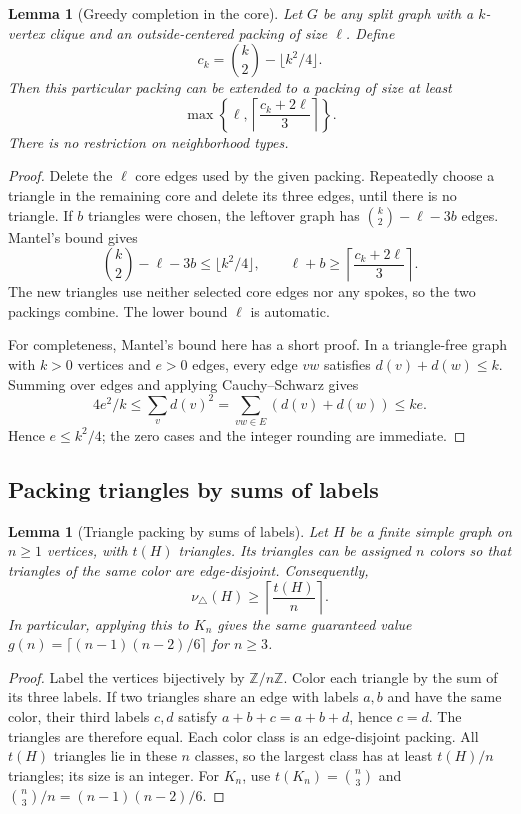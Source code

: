 \documentclass[11pt]{article}
\newtheorem{lemma}[theorem]{Lemma}
\newcommand{\tp}{\nu_{\triangle}}
\begin{document}
\begin{lemma}[Greedy completion in the core]\label{lem:completion}
Let $G$ be any split graph with a $k$-vertex clique and an outside-centered
packing of size $\ell$. Define
\[
 c_k=\binom k2-\lfloor k^2/4\rfloor.
\]
Then this particular packing can be extended to a packing of size at least
\[
 \boxed{\max\left\{\ell,
      \left\lceil\frac{c_k+2\ell}{3}\right\rceil\right\}.}
\]
There is no restriction on neighborhood types.
\end{lemma}
\begin{proof}
Delete the $\ell$ core edges used by the given packing. Repeatedly choose
a triangle in the remaining core and delete its three edges, until there
is no triangle. If $b$ triangles were chosen, the leftover graph has
$\binom k2-\ell-3b$ edges. Mantel's bound gives
\[
 \binom k2-\ell-3b\leq\lfloor k^2/4\rfloor,
 \qquad
 \ell+b\geq\left\lceil\frac{c_k+2\ell}{3}\right\rceil.
\]
The new triangles use neither selected core edges nor any spokes, so the
two packings combine. The lower bound $\ell$ is automatic.

For completeness, Mantel's bound here has a short proof. In a
triangle-free graph with $k>0$ vertices and $e>0$ edges, every edge $vw$
satisfies $d(v)+d(w)\leq k$. Summing over edges and applying
Cauchy--Schwarz gives
\[
 4e^2/k\leq\sum_v d(v)^2
   =\sum_{vw\in E}(d(v)+d(w))\leq ke.
\]
Hence $e\leq k^2/4$; the zero cases and the integer rounding are immediate.
\end{proof}


\subsection{Packing triangles by sums of labels}

\begin{lemma}[Triangle packing by sums of labels]\label{lem:sum-coloring}
Let $H$ be a finite simple graph on $n\geq1$ vertices, with $t(H)$
triangles. Its triangles can be assigned $n$ colors so that triangles
of the same color are edge-disjoint. Consequently,
\[
 \tp(H)\geq\left\lceil\frac{t(H)}n\right\rceil.
\]
In particular, applying this to $K_n$ gives the same guaranteed value
$g(n)=\lceil(n-1)(n-2)/6\rceil$ for $n\geq3$.
\end{lemma}
\begin{proof}
Label the vertices bijectively by $\mathbb Z/n\mathbb Z$. Color each
triangle by the sum of its three labels. If two triangles share an edge
with labels $a,b$ and have the same color, their third labels $c,d$
satisfy $a+b+c=a+b+d$, hence $c=d$. The triangles are therefore equal.
Each color class is an edge-disjoint packing. All $t(H)$ triangles lie
in these $n$ classes, so the largest class has at least $t(H)/n$
triangles; its size is an integer. For $K_n$, use
$t(K_n)=\binom n3$ and $\binom n3/n=(n-1)(n-2)/6$.
\end{proof}
\end{document}
